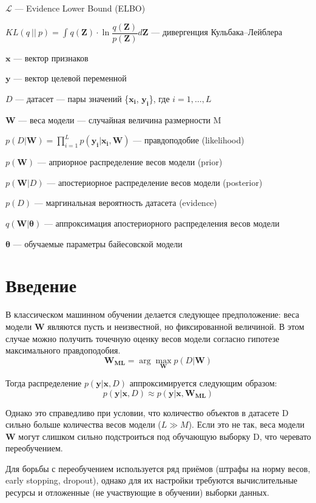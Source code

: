 \documentclass{article}
\newcommand{\argmax}{\arg\!\max}
\begin{document}
$\mathcal{L}$ --- Evidence Lower Bound (ELBO)

$KL(q~||~p) = \int_{}{} q(\pmb{Z}) \cdot \ln{\dfrac{q(\pmb{Z})}{p(\pmb{Z})}} d \pmb{Z}$ --- дивергенция Кульбака--Лейблера

$\pmb{x}$ --- вектор признаков

$\pmb{y}$ --- вектор целевой переменной

$D$ --- датасет --- пары значений \{$\pmb{x_i}$, $\pmb{y_i}$\}, где $i = 1, \dots, L$

$\pmb{W}$ --- веса модели --- случайная величина размерности M

$p(D | \pmb{W}) = \prod_{i=1}^{L} p(\pmb{y_i} | \pmb{x_i}, \pmb{W})$ — правдоподобие (likelihood)

$p(\pmb{W})$ --- априорное распределение весов модели (prior)

$p(\pmb{W}| D)$ --- апостериорное распределение весов модели (posterior)

$p(D)$ --- маргинальная вероятность датасета (evidence)

$q(\pmb{W} | \pmb{\theta})$ --- аппроксимация апостериорного распределения весов модели

$\pmb{\theta}$ --- обучаемые параметры байесовской модели

\section{Введение}

В классическом машинном обучении делается следующее предположение: веса модели $\pmb{W}$ являются пусть и неизвестной, но фиксированной величиной. В этом случае можно получить точечную оценку весов модели согласно гипотезе максимального правдоподобия.
\[
 \pmb{W_{ML}} = \argmax_{\pmb{W}} p(D | \pmb{W})
\]

Тогда распределение $p(\pmb{y} | \pmb{x}, D)$ аппроксимируется следующим образом:
\[
 p(\pmb{y} | \pmb{x}, D) \approx p(\pmb{y} | \pmb{x}, \pmb{W_{ML}})
\]

Однако это справедливо при условии, что количество объектов в датасете D сильно больше количества весов модели ($L \gg M$). Если это не так, веса модели $\pmb{W}$ могут слишком сильно подстроиться под обучающую выборку D, что черевато переобучением.

Для борьбы с переобучением используется ряд приёмов (штрафы на норму весов, early stopping, dropout), однако для их настройки требуются вычислительные ресурсы и отложенные (не участвующие в обучении) выборки данных.
\end{document}
